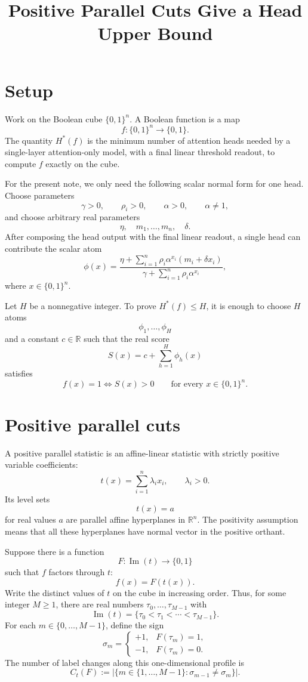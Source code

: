 \documentclass[11pt]{article}
\title{\vspace{-2.0em}Positive Parallel Cuts Give a Head Upper Bound}
\author{}
\date{}
\newcommand{\cube}{\{0,1\}}
\newcommand{\R}{\mathbb{R}}
\newcommand{\Hstar}{H^{\ast}}
\newcommand{\im}{\operatorname{Im}}
\begin{document}
\maketitle
\vspace{-2.6em}

\section*{Setup}

Work on the Boolean cube $\cube^n$.  A Boolean function is a map
\[
f:\cube^n\to\cube.
\]
The quantity $\Hstar(f)$ is the minimum number of attention heads needed by a
single-layer attention-only model, with a final linear threshold readout, to
compute $f$ exactly on the cube.

For the present note, we only need the following scalar normal form for one
head.  Choose parameters
\[
\gamma>0,\qquad \rho_i>0,\qquad \alpha>0,\qquad \alpha\neq1,
\]
and choose arbitrary real parameters
\[
\eta,\quad m_1,\ldots,m_n,\quad \delta.
\]
After composing the head output with the final linear readout, a single head can
contribute the scalar atom
\[
\phi(x)=
\frac{\eta+\sum_{i=1}^{n}\rho_i\alpha^{x_i}(m_i+\delta x_i)}
     {\gamma+\sum_{i=1}^{n}\rho_i\alpha^{x_i}},
\]
where $x\in\cube^n$.

Let $H$ be a nonnegative integer.  To prove $\Hstar(f)\leq H$, it is enough to
choose $H$ atoms
\[
\phi_1,\ldots,\phi_H
\]
and a constant $c\in\R$ such that the real score
\[
S(x)=c+\sum_{h=1}^{H}\phi_h(x)
\]
satisfies
\[
f(x)=1 \iff S(x)>0
\qquad
\text{for every }x\in\cube^n.
\]

\section*{Positive parallel cuts}

A positive parallel statistic is an affine-linear statistic with strictly
positive variable coefficients:
\[
t(x)=\sum_{i=1}^{n}\lambda_i x_i,
\qquad
\lambda_i>0.
\]
Its level sets
\[
t(x)=a
\]
for real values $a$ are parallel affine hyperplanes in $\R^n$.  The positivity
assumption means that all these hyperplanes have normal vector in the positive
orthant.

Suppose there is a function
\[
F:\im(t)\to\cube
\]
such that $f$ factors through $t$:
\[
f(x)=F(t(x)).
\]
Write the distinct values of $t$ on the cube in increasing order.  Thus, for
some integer $M\geq1$, there are real numbers $\tau_0,\ldots,\tau_{M-1}$ with
\[
\im(t)=\{\tau_0<\tau_1<\cdots<\tau_{M-1}\}.
\]
For each $m\in\{0,\ldots,M-1\}$, define the sign
\[
\sigma_m=
\begin{cases}
+1,&F(\tau_m)=1,\\
-1,&F(\tau_m)=0.
\end{cases}
\]
The number of label changes along this one-dimensional profile is
\[
C_t(F):=
\left|\{m\in\{1,\ldots,M-1\}:\sigma_{m-1}\neq\sigma_m\}\right|.
\]
\end{document}
